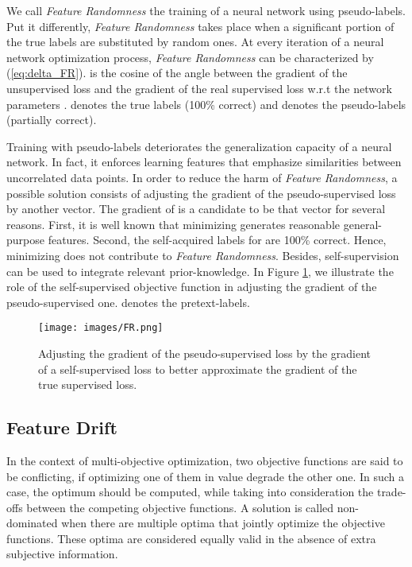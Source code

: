 \documentclass{article}
\begin{document}
We call \textit{Feature Randomness} the training of a neural network using pseudo-labels. Put it differently, \textit{Feature Randomness} takes place when a significant portion of the true labels are substituted by random ones. At every iteration of a neural network optimization process, \textit{Feature Randomness} can be characterized by  (\ref{eq:delta_FR}).  is the cosine of the angle between the gradient of the unsupervised loss and the gradient of the real supervised loss w.r.t the network parameters .  denotes the true labels (100\% correct) and  denotes the pseudo-labels (partially correct).








Training with pseudo-labels deteriorates the generalization capacity of a neural network. In fact, it enforces learning features that emphasize similarities between uncorrelated data points. In order to reduce the harm of \textit{Feature Randomness}, a possible solution consists of adjusting the gradient of the pseudo-supervised loss  by another vector. The gradient of  is a candidate to be that vector for several reasons. First, it is well known that minimizing  generates reasonable general-purpose features. Second, the self-acquired labels for  are 100\% correct. Hence, minimizing  does not contribute to \textit{Feature Randomness}. Besides, self-supervision can be used to integrate relevant prior-knowledge. In Figure \ref{fig:fr_Ls}, we illustrate the role of the self-supervised objective function in adjusting the gradient of the pseudo-supervised one.  denotes the pretext-labels.
 


\begin{figure}[ht]
\vskip 0.2in
\begin{center}
\centerline{\texttt{[image: images/FR.png]}}
\caption{Adjusting the gradient of the pseudo-supervised loss by the gradient of a self-supervised loss to better approximate the gradient of the true supervised loss.}
\label{fig:fr_Ls}
\end{center}
\end{figure}


\subsection{Feature Drift}
In the context of multi-objective optimization, two objective functions are said to be conflicting, if optimizing one of them in value degrade the other one. In such a case, the optimum should be computed, while taking into consideration the trade-offs between the competing objective functions. A solution is called non-dominated when there are multiple optima that jointly optimize the objective functions. These optima are considered equally valid in the absence of extra subjective information.
\end{document}
